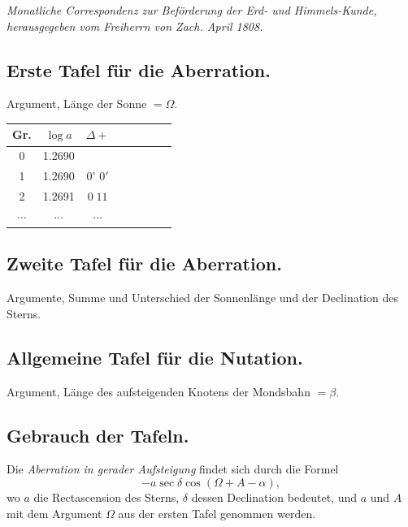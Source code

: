 \documentclass[12pt,a4paper]{article}
\begin{document}

\begin{center}
\textit{Monatliche Correspondenz zur Beförderung der Erd- und Himmels-Kunde,}\\
\textit{herausgegeben vom Freiherrn von Zach. April 1808.}
\end{center}

\vspace{1em}

\subsection{Erste Tafel für die Aberration.}

Argument, Länge der Sonne $= \Omega$.

\begin{center}
\small
\begin{tabular}{|*{8}{c|}}
\hline
Gr. & $\log a$ & $\Delta+$ & & & & & \\
\hline
0 & 1.2690 & & & & & & \\
1 & 1.2690 & $0^{\circ}\;0'$ & & & & & \\
2 & 1.2691 & $0\;11$ & & & & & \\
$\cdots$ & $\cdots$ & $\cdots$ & & & & & \\
\hline
\end{tabular}
\end{center}

\subsection{Zweite Tafel für die Aberration.}

Argumente, Summe und Unterschied der Sonnenlänge und der Declination des Sterns.

\subsection{Allgemeine Tafel für die Nutation.}

Argument, Länge des aufsteigenden Knotens der Mondsbahn $= \beta$.

\subsection{Gebrauch der Tafeln.}

Die \emph{Aberration in gerader Aufsteigung} findet sich durch die Formel
\[
- a\sec\delta\cos(\Omega + A - \alpha),
\]
wo $a$ die Rectascension des Sterns, $\delta$ dessen Declination bedeutet, und $a$ und
$A$ mit dem Argument $\Omega$ aus der ersten Tafel genommen werden.
\end{document}
